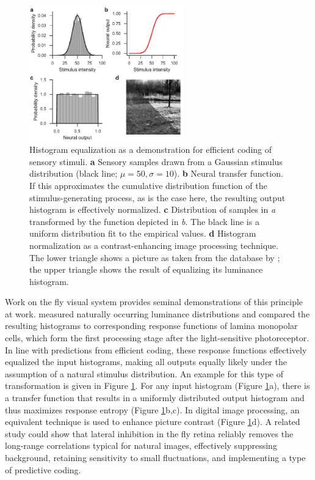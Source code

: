 \begin{figure}
    \centering
    \includegraphics[width=0.6\textwidth]{graphics/figure_equalization}
    \caption[Histogram equalization]
    {Histogram equalization as a demonstration for efficient coding of sensory stimuli. \textbf{a} Sensory samples drawn from a Gaussian stimulus distribution (black line; $\mu = 50, \sigma = 10$). \textbf{b} Neural transfer function. If this approximates the cumulative distribution function of the stimulus-generating process, as is the case here, the resulting output histogram is effectively normalized. \textbf{c} Distribution of samples in \textit{a} transformed by the function depicted in \textit{b}. The black line is a uniform distribution fit to the empirical values. \textbf{d} Histogram normalization as a contrast-enhancing image processing technique. The lower triangle shows a picture as taken from the database by \citet{vanHateren:1998jt}; the upper triangle shows the result of equalizing its luminance histogram.}
    \label{fig:equalization}
\end{figure}

Work on the fly visual system provides seminal demonstrations of this principle at work. \citet{Laughlin:1981wn} measured naturally occurring luminance distributions and compared the resulting histograms to corresponding response functions of lamina monopolar cells, which form the first processing stage after the light-sensitive photoreceptor. In line with predictions from efficient coding, these response functions effectively equalized the input histograms, making all outputs equally likely under the assumption of a natural stimulus distribution. An example for this type of transformation is given in Figure \ref{fig:equalization}. For any input histogram (Figure \ref{fig:equalization}a), there is a transfer function that results in a uniformly distributed output histogram and thus maximizes response entropy (Figure \ref{fig:equalization}b,c). In digital image processing, an equivalent technique is used to enhance picture contrast (Figure \ref{fig:equalization}d). A related study \citep{Srinivasan:1982uq} could show that lateral inhibition in the fly retina reliably removes the long-range correlations typical for natural images, effectively suppressing background, retaining sensitivity to small fluctuations, and implementing a type of predictive coding.

